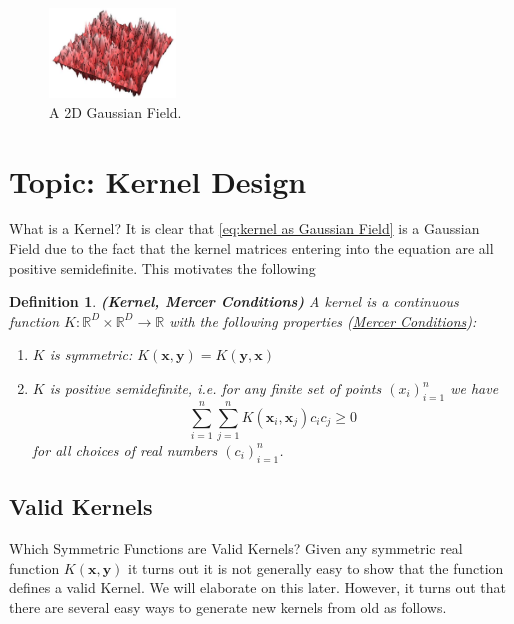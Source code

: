 \documentclass[11pt]{article}
\theoremstyle{plain} %
\newtheorem{definition}[theorem]{Definition}
\theoremstyle{remark}
\begin{document}
\begin{figure}[!htp]
  \centering
  \includegraphics[width=0.3\textwidth]{images/2023_11_26_5b299dbd302e8f129737g-22}
  \caption{A 2D Gaussian Field.}
  \label{fig:2D Gaussian Field}
\end{figure}

\section{Topic:  Kernel Design}

What is a Kernel? It is clear that \cref{eq:kernel as Gaussian Field} is a Gaussian Field due to the fact that
the kernel matrices entering into the equation are all positive semidefinite.
This motivates the following

\begin{definition}\label{def: Mercer Conditions}
  \textbf{(Kernel, Mercer Conditions)} A kernel is a continuous function $K: \mathbb{R}^{D} \times \mathbb{R}^{D}
    \rightarrow \mathbb{R}$ with the following properties (\href{https://en.wikipedia.org/wiki/Mercer%27s_theorem}{Mercer Conditions}):
  \begin{enumerate}
    \item $K$ is symmetric: $K(\mathbf{x}, \mathbf{y})=K(\mathbf{y}, \mathbf{x})$
    \item $K$ is positive semidefinite, i.e. for any finite set of points
          $\left(x_{i}\right)_{i=1}^{n}$ we have
          $$
            \sum_{i=1}^{n} \sum_{j=1}^{n} K\left(\mathbf{x}_{i}, \mathbf{x}_{j}\right) c_{i} c_{j} \geq 0
          $$
          for all choices of real numbers $\left(c_{i}\right)_{i=1}^{n}$.
  \end{enumerate}
\end{definition}

\subsection{Valid Kernels}
Which Symmetric Functions are Valid Kernels? Given any symmetric real function
$K(\mathbf{x}, \mathbf{y})$ it turns out it is not generally easy to show that
the function defines a valid Kernel. We will elaborate on this later. However,
it turns out that there are several easy ways to generate new kernels from old
as follows.
\end{document}
